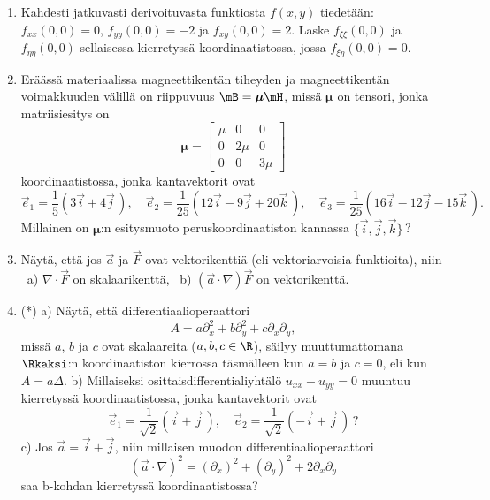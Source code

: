 \Harj
\begin{enumerate}

\item
Kahdesti jatkuvasti derivoituvasta funktiosta $f(x,y)$ tiedetään: $f_{xx}(0,0)=0$,
$f_{yy}(0,0)=-2$ ja $f_{xy}(0,0)=2$. Laske $f_{\xi\xi}(0,0)$ ja $f_{\eta\eta}(0,0)$ sellaisessa
kierretyssä koordinaatistossa, jossa $f_{\xi\eta}(0,0)=0$.

\item
Eräässä materiaalissa magneettikentän tiheyden ja magneettikentän voimakkuuden välillä on
riippuvuus $\mB=\boldsymbol{\mu}\mH$, missä $\boldsymbol{\mu}$ on tensori, jonka
matriisiesitys on
\[
\boldsymbol{\mu}= \begin{bmatrix} \mu&0&0 \\ 0&2\mu&0 \\ 0&0&3\mu \end{bmatrix}
\]
koordinaatistossa, jonka kantavektorit ovat
\[
\vec e_1=\frac{1}{5}(3\vec i+ 4\vec j\,), \quad 
\vec e_2=\frac{1}{25}(12\vec i-9\vec j+20\vec k\,), \quad 
\vec e_3=\frac{1}{25}(16\vec i-12\vec j-15\vec k\,). 
\]
Millainen on $\boldsymbol{\mu}$:n esitysmuoto peruskoordinaatiston kannassa
$\{\vec i,\vec j,\vec k\}$\,?

\item
Näytä, että jos $\vec a$ ja $\vec F$ ovat vektorikenttiä (eli vektoriarvoisia funktioita),
niin \, a) $\nabla\cdot\vec F$ on skalaarikenttä, \ b) $(\vec a\cdot\nabla)\vec F$ on
vektorikenttä.

\item (*)
a) Näytä, että differentiaalioperaattori
\[
A=a\partial_x^2+b\partial_y^2+c\partial_x\partial_y,
\]
missä $a$, $b$ ja $c$ ovat skalaareita ($a,b,c\in\R$), säilyy muuttumattomana $\Rkaksi$:n
koordinaatiston kierrossa täsmälleen kun $a=b$ ja $c=0$,
eli kun $A=a\Delta$. \vspace{1mm}\newline
b) Millaiseksi osittaisdifferentialiyhtälö $u_{xx}-u_{yy}=0$ muuntuu kierretyssä 
koordinaatistossa, jonka kantavektorit ovat
\[
\vec e_1=\frac{1}{\sqrt{2}}(\vec i+\vec j\,), \quad 
\vec e_2=\frac{1}{\sqrt{2}}(-\vec i+\vec j\,)\,?
\]
c) Jos $\vec a=\vec i+\vec j$, niin millaisen muodon differentiaalioperaattori
\[
(\vec a\cdot\nabla)^2 = (\partial_x)^2+(\partial_y)^2+2\partial_x\partial_y
\]
saa b-kohdan kierretyssä koordinaatistossa?

\end{enumerate}